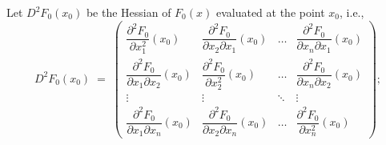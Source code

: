 Let $D^2F_0(x_0)$ be the Hessian of $F_0(x)$ evaluated at the point $x_0$, i.e.,
\begin{equation}
D^2F_0(x_0) \;=\; \begin{pmatrix}
\dfrac{\partial^2 F_0}{\partial x_1^2}(x_0) & \dfrac{\partial^2 F_0}{\partial x_2\partial x_1}(x_0) & \ldots & \dfrac{\partial^2 F_0}{\partial x_n\partial x_1}(x_0) \\[1.2ex]
\dfrac{\partial^2 F_0}{\partial x_1\partial x_2}(x_0) & \dfrac{\partial^2 F_0}{\partial x_2^2}(x_0) & \ldots & \dfrac{\partial^2 F_0}{\partial x_n\partial x_2}(x_0) \\[1.2ex]
\vdots & \vdots & \ddots & \vdots \\[0.6ex]
\dfrac{\partial^2 F_0}{\partial x_1\partial x_n}(x_0) & \dfrac{\partial^2 F_0}{\partial x_2\partial x_n}(x_0) & \ldots & \dfrac{\partial^2 F_0}{\partial x_n^2}(x_0)
\end{pmatrix};
\end{equation}
